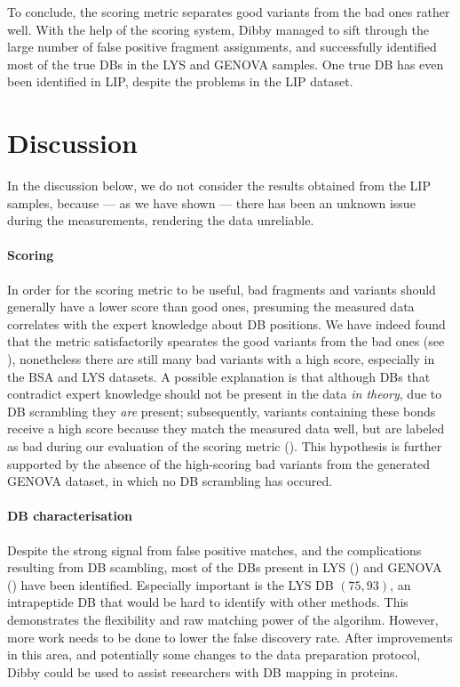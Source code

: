 To conclude, the scoring metric separates good variants from the bad ones rather well. With the help of the scoring system, Dibby managed to sift through the large number of false positive fragment assignments, and successfully identified most of the true DBs in the LYS and GENOVA samples. One true DB has even been identified in LIP, despite the problems in the LIP dataset.


\section{Discussion}

In the discussion below, we do not consider the results obtained from the LIP samples, because --- as we have shown --- there has been an unknown issue during the measurements, rendering the data unreliable.

\paragraph{Scoring} In order for the scoring metric to be useful, bad fragments and variants should generally have a lower score than good ones, presuming the measured data correlates with the expert knowledge about DB positions. We have indeed found that the metric satisfactorily spearates the good variants from the bad ones (see ), nonetheless there are still many bad variants with a high score, especially in the BSA and LYS datasets. A possible explanation is that although DBs that contradict expert knowledge should not be present in the data \emph{in theory}, due to DB scrambling they \emph{are} present; subsequently, variants containing these bonds receive a high score because they match the measured data well, but are labeled as bad during our evaluation of the scoring metric (). This hypothesis is further supported by the absence of the high-scoring bad variants from the generated GENOVA dataset, in which no DB scrambling has occured.



\paragraph{DB characterisation} Despite the strong signal from false positive matches, and the complications resulting from DB scambling, most of the DBs present in LYS () and GENOVA () have been identified. Especially important is the LYS DB \((75, 93)\), an intrapeptide DB that would be hard to identify with other methods. This demonstrates the flexibility and raw matching power of the algorihm. However, more work needs to be done to lower the false discovery rate. After improvements in this area, and potentially some changes to the data preparation protocol, Dibby could be used to assist researchers with DB mapping in proteins.

